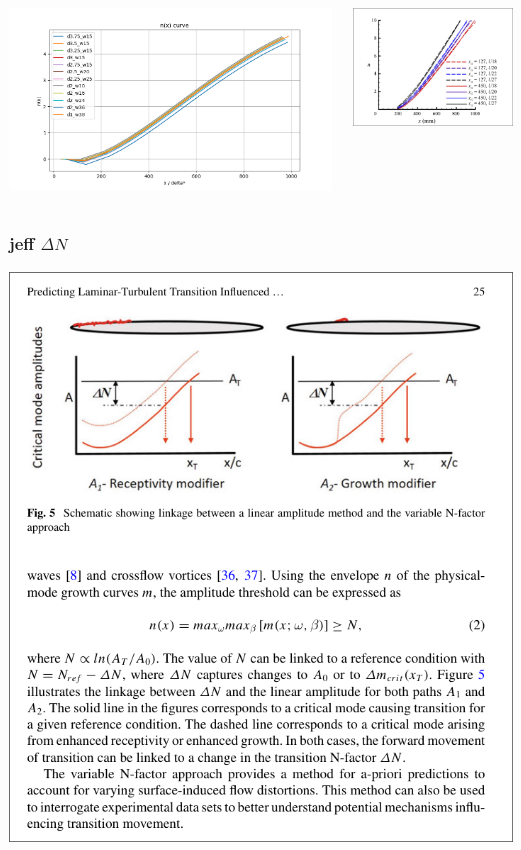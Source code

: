 \documentclass[
  aspectratio=169, %
  t, %
  onlytextwidth, %
  10pt, %
]{beamer}
\begin{document}
\begin{frame}
	\centering
	\begin{columns}[T] %
		\begin{column}{0.6\linewidth} %
			\includegraphics[width=\linewidth]{Images/nfactorCurve.png}
		\end{column}
		\begin{column}{0.38\linewidth} %
			\includegraphics[width=\textwidth]{Images/jeffn.png}
		\end{column}
	\end{columns}
\end{frame}
\begin{frame}
	\frametitle{jeff $\Delta N$}

	\centering
	\includegraphics[width=0.5\linewidth]{Images/jeffPaper.png}
  
\end{frame}
\end{document}
